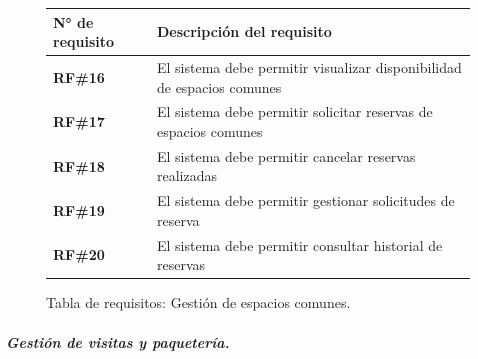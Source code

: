 \begin{figure}[H]
    \centering
    \begin{tabular}{|l|p{11cm}|}
    \hline
            \textbf{N° de requisito} 
        
        & 

            \textbf{Descripción del requisito} 
        
    \\ \hline
    
            \textbf{RF\#16} 
        
        & 

            El sistema debe permitir visualizar disponibilidad de espacios comunes 
        
    \\ \hline
    
            \textbf{RF\#17} 
        
        & 

            El sistema debe permitir solicitar reservas de espacios comunes 
        
    \\ \hline
    
            \textbf{RF\#18} 
        
        & 

            El sistema debe permitir cancelar reservas realizadas 
        
    \\ \hline
    
            \textbf{RF\#19} 
        
        & 

            El sistema debe permitir gestionar solicitudes de reserva 
        
    \\ \hline
    
            \textbf{RF\#20} 
        
        & 

            El sistema debe permitir consultar historial de reservas 
        
    \\ \hline
    \end{tabular}
    \caption{Tabla de requisitos: Gestión de espacios comunes.}
\end{figure}

\subparagraph{Gestión de visitas y paquetería.}

